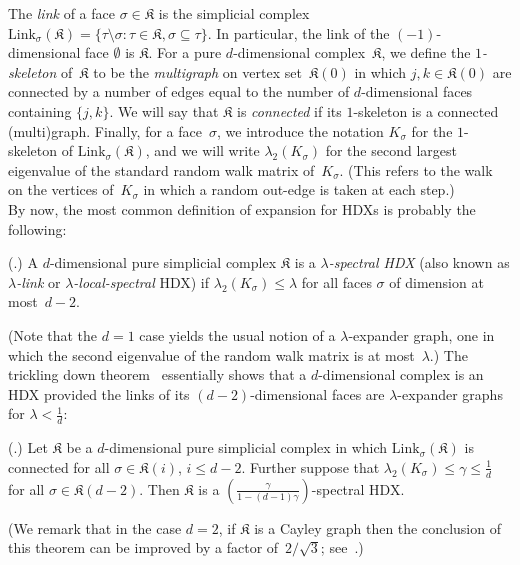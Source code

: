 \documentclass[11pt]{article}
\newcommand{\Link}{\mathrm{Link}}
\newcommand{\complex}{\mathfrak{K}}
\begin{document}
The \emph{link} of a face $\sigma \in \complex$ is the simplicial complex $\Link_\sigma(\complex) = \{\tau \setminus \sigma: \tau \in \complex, \sigma \subseteq \tau\}$. In particular, the link of the $(-1)$-dimensional face $\emptyset$ is $\complex$.
For a pure $d$-dimensional complex~$\complex$, we define the \emph{$1$-skeleton} of~$\complex$ to be the \emph{multigraph} on vertex set~$\complex(0)$ in which $j,k \in \complex(0)$ are connected by a number of edges equal to the number of $d$-dimensional faces containing $\{j,k\}$.  We will say that $\complex$ is \emph{connected} if its $1$-skeleton is a connected (multi)graph.  Finally, for a face~$\sigma$, we introduce the notation $K_\sigma$ for the $1$-skeleton of $\Link_\sigma(\complex)$, and we will write $\lambda_2(K_\sigma)$ for the second largest eigenvalue of the standard random walk matrix of~$K_\sigma$. (This refers to the walk on the vertices of~$K_\sigma$ in which a random out-edge is taken at each step.)\\


By now, the most common definition of expansion for HDXs is probably the following:
\begin{definition}
    (\cite{Opp18,KO18}.) A $d$-dimensional pure simplicial complex $\complex$ is a \emph{$\lambda$-spectral HDX} (also known as \emph{$\lambda$-link} or \emph{$\lambda$-local-spectral} HDX) if $\lambda_2(K_\sigma) \le \lambda$ for all faces $\sigma$ of dimension at most~$d-2$.
\end{definition}
\noindent (Note that the $d = 1$ case yields the usual notion of a $\lambda$-expander graph, one in which the second eigenvalue of the random walk matrix is at most~$\lambda$.)  The trickling down theorem~\cite{Opp18} essentially shows that a $d$-dimensional complex is an HDX provided the links of its $(d-2)$-dimensional faces are $\lambda$-expander graphs for $\lambda < \frac{1}{d}$:
\begin{theorem}\label{thm:trickle}
    \textnormal{(\cite{Opp18}.)}
     Let $\complex$ be a $d$-dimensional pure simplicial complex in which $\Link_\sigma(\complex)$ is connected for all $\sigma \in \complex(i)$, $i \leq d-2$.  Further suppose that $\lambda_2(K_\sigma) \leq \gamma \leq \frac{1}{d}$ for all $\sigma \in \complex(d-2)$.
    Then $\complex$ is a $\left (\frac{\gamma}{1-(d-1)\gamma} \right)$-spectral HDX.
\end{theorem}
\noindent (We remark that in the case $d = 2$, if $\complex$ is a Cayley graph then the conclusion of this theorem can be improved by a factor of~$2/\sqrt{3}$; see~\cite{Zuk03}.)\\
\end{document}
